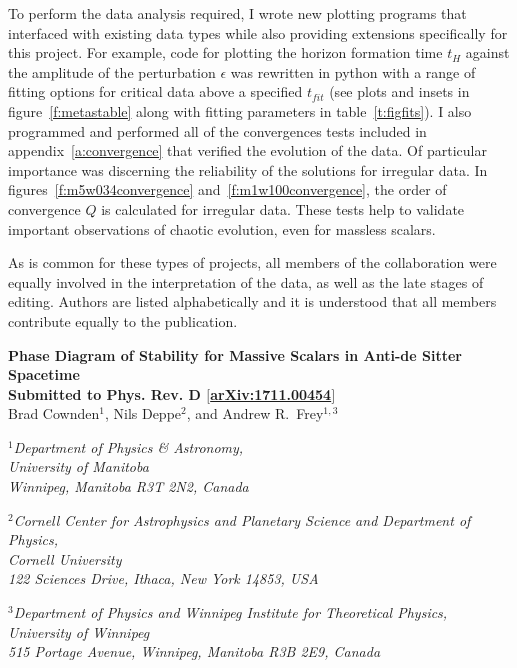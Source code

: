 \documentclass[../PhD.tex]{subfiles}
\begin{document}
To perform the data analysis required, I wrote new plotting programs that interfaced with existing data types while also providing extensions specifically for this project. For example, code for plotting the horizon formation time $t_H$ against the amplitude of the perturbation $\epsilon$ was rewritten in python with a range of fitting options for critical data above a specified $t_{fit}$ (see plots and insets in figure~\ref{f:metastable} along with fitting parameters in table~\ref{t:figfits}). I also programmed and performed all of the convergences tests included in appendix~\ref{a:convergence} that verified the evolution of the data. Of particular importance was discerning the reliability of the solutions for irregular data. In figures~\ref{f:m5w034convergence} and~\ref{f:m1w100convergence}, the order of convergence $Q$ is calculated for irregular data. These tests help to validate important observations of chaotic evolution, even for massless scalars.

As is common for these types of projects, all members of the collaboration were equally involved in the interpretation of the data, as well as the late stages of editing. Authors are listed alphabetically and it is understood that all members contribute equally to the publication.

\newpage


\begin{center}
{\bf{\Large Phase Diagram of Stability for Massive Scalars in Anti-de Sitter
Spacetime}} \\
\bigskip
{\bf Submitted to Phys. Rev. D $\big[$\href{https://arxiv.org/abs/1711.00454}{arXiv:1711.00454}$\big]$ } \\
\bigskip
\bigskip
Brad Cownden$^1$, Nils Deppe$^2$, and Andrew R.~Frey$^{1,3}$\\
\bigskip

$^1${\it Department of Physics \& Astronomy,\\ University of Manitoba\\
Winnipeg, Manitoba R3T 2N2, Canada }
\vspace{0.1in}

$^2${\it Cornell Center for Astrophysics and Planetary Science and
Department of Physics,\\ Cornell University\\
122 Sciences Drive, Ithaca, New York 14853, USA}
\vspace{0.1in}

$^3${\it Department of Physics and Winnipeg Institute for Theoretical
Physics,\\ University of Winnipeg\\
515 Portage Avenue, Winnipeg, Manitoba R3B 2E9, Canada}
\end{center}
\end{document}
